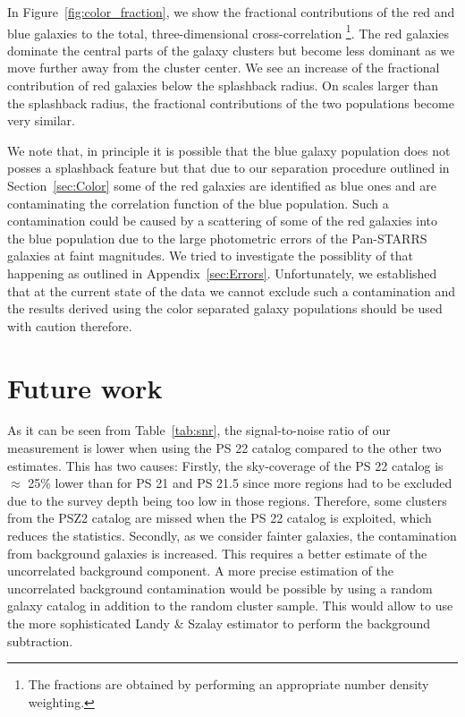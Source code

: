 \documentclass[iop, apjl, twocolappendix, numberedappendix]{emulateapj}
\begin{document}
In Figure~\ref{fig:color_fraction}, we show the fractional
contributions of the red and blue galaxies to the total,
three-dimensional cross-correlation \footnote{The fractions are
obtained by performing an appropriate number density weighting.}.
The red galaxies dominate the central parts of the galaxy clusters
but become less dominant as we move further away from the cluster center.
We see an increase of the fractional contribution of
red galaxies below the splashback radius. On scales larger than the
splashback radius, the fractional contributions of the two populations become
very similar.

We note that, in principle it is possible that the blue galaxy population does not posses
a splashback feature but that due to our separation procedure outlined in Section~\ref{sec:Color}
some of the red galaxies are identified as blue ones and are contaminating the correlation function
of the blue population. Such a contamination could be caused by a scattering of some of the red galaxies
into the blue population due to the large photometric errors of the Pan-STARRS galaxies at faint magnitudes.
We tried to investigate the possiblity of that happening as outlined in 
Appendix~\ref{sec:Errors}. Unfortunately, we established that at the current state of the data we cannot
exclude such a contamination and the results derived using the color separated galaxy populations
should be used with caution therefore.

\section{Future work}
\label{sec:Future}

As it can be seen from Table~\ref{tab:snr}, the signal-to-noise
ratio of our measurement is lower when using the PS 22 catalog
compared to the other two estimates. This has two causes: Firstly,
the sky-coverage of the PS 22 catalog is $\approx$ 25\% lower than
for PS 21 and PS 21.5 since more regions had to be excluded due to
the survey depth being too low in those regions. Therefore, some
clusters from the PSZ2 catalog are missed when the PS 22 catalog is
exploited, which reduces the statistics. Secondly, as we consider
fainter galaxies, the contamination from background galaxies is
increased. This requires a better estimate of the uncorrelated
background component. A more precise estimation of the uncorrelated
background contamination would be possible by using a random galaxy
catalog in addition to the random cluster sample. This would allow
to use the more sophisticated Landy \& Szalay estimator
\citep{landy1993bias} to perform the background subtraction.
\end{document}
